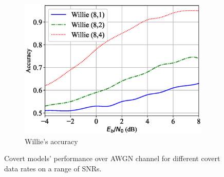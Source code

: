 \begin{figure}[tp!]
\begin{subfigure}{0.28\textwidth}
		\includegraphics[width=\linewidth]{figs/willie_accuracy_awgn}
		\caption{Willie's accuracy}	
		\label{fig:awgn_resutls_willie}
	\end{subfigure}
	\caption{Covert models' performance over AWGN channel for different covert data rates on a range of SNRs.}
	\label{fig:awgn_results}
\end{figure}
